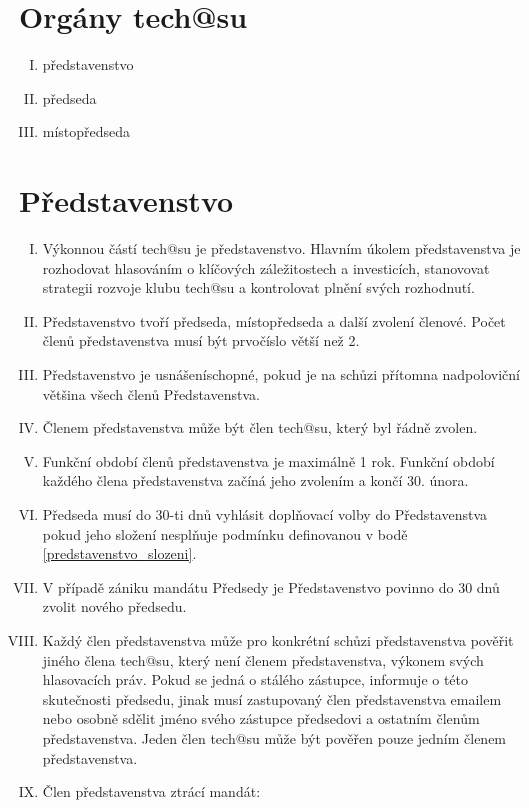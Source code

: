 \documentclass[10pt]{article}
\begin{document}
\section{Orgány tech@su} %
	\begin{enumerate}[I.]
	\item představenstvo 
	\item předseda  
	\item místopředseda  
	\end{enumerate}

\section{Představenstvo} %
	\begin{enumerate}[I.]
	\item Výkonnou částí tech@su je představenstvo. Hlavním úkolem představenstva je rozhodovat hlasováním o klíčových záležitostech a investicích, stanovovat strategii rozvoje klubu tech@su a kontrolovat plnění svých rozhodnutí. 
	\item \label{predstavenstvo_slozeni} Představenstvo tvoří předseda, místopředseda a další zvolení členové. Počet členů představenstva musí být prvočíslo větší než 2.
	\item Představenstvo je usnášeníschopné, pokud je na schůzi přítomna nadpoloviční většina všech členů Představenstva.
	\item Členem představenstva může být člen tech@su, který byl řádně zvolen.
	\item Funkční období členů představenstva je maximálně 1 rok. Funkční období každého člena představenstva začíná jeho zvolením a končí 30. února.
	\item Předseda musí do 30-ti dnů vyhlásit doplňovací volby do Představenstva pokud jeho složení nesplňuje podmínku definovanou v bodě \ref{predstavenstvo_slozeni}.
	\item V případě zániku mandátu Předsedy je Představenstvo povinno do 30 dnů zvolit nového předsedu.
	\item \label{povereni} Každý člen představenstva může pro konkrétní schůzi představenstva pověřit jiného člena tech@su, který není členem představenstva, výkonem svých hlasovacích práv. Pokud se jedná o stálého zástupce, informuje o této skutečnosti předsedu, jinak musí zastupovaný člen představenstva emailem nebo osobně sdělit jméno svého zástupce předsedovi a ostatním členům představenstva. Jeden člen tech@su může být pověřen pouze jedním členem představenstva.  
	\item Člen představenstva ztrácí mandát:

\end{enumerate}
\end{document}
